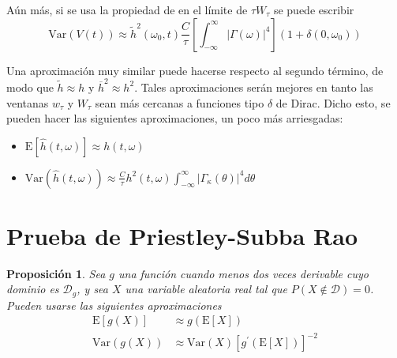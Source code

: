 \documentclass[12pt,letterpaper,draft]{book}
\newtheorem{proposicion}[teorema]{Proposición}
\newcommand{\intR}{\int_{-\infty}^{\infty}}
\newcommand{\prima}{^{\prime}}
\newcommand{\dirac}{$\delta$  de Dirac}
\newcommand{\est}[1]{\widehat{ #1 }}
\newcommand{\E}[1]{\mathrm{E}\left[ #1 \right]}
\newcommand{\Var}[1]{\mathrm{Var}\left( #1 \right)}
\newcommand{\abso}[1]{\left| #1 \right|}
\begin{document}
Aún más, si se usa la propiedad de en el límite de $\tau W_\tau$ se puede escribir
\begin{equation}
\Var{V(t)} \approx 
\widetilde{h}^{2}(\omega_0,t) \frac{C}{\tau} \left[ \intR \abso{\Gamma(\omega)}^{4} \right] (1+\delta(0,\omega_0))
\end{equation}

Una aproximación muy similar 
puede hacerse respecto al segundo término, de modo que $\widetilde{h}\approx h$ y 
$\overline{h}^{2}\approx h^{2}$.
Tales aproximaciones serán mejores en tanto las ventanas $w_{\tau}$ y $W_{\tau}$ sean más 
cercanas a funciones tipo \dirac.
Dicho esto, se pueden hacer las siguientes aproximaciones, un poco más arriesgadas:
\begin{itemize}
\item $\displaystyle \E{\est{h}(t,\omega)} \approx h(t,\omega)$
\item $\displaystyle \Var{\est{h}(t,\omega)} \approx 
\frac{C}{\tau} h^{2}(t,\omega) \intR \abso{\Gamma_\kappa (\theta)}^{4} d\theta$
\end{itemize}


\section{Prueba de Priestley-Subba Rao}
\label{sec:psr}

\begin{proposicion}
Sea $g$ una función cuando menos dos veces derivable cuyo dominio es $\mathcal{D}_g$, y sea $X$ una variable aleatoria real tal que $P(X\notin \mathcal{D}) = 0$. 
%
Pueden usarse las siguientes aproximaciones
\begin{align}
\E{g(X)} &\approx g\left( \E{X} \right) \\
\Var{g(X)} &\approx \Var{X} \left[ g\prima \left( \E{X} \right) \right]^{-2}
\end{align}
\end{proposicion}
\end{document}

